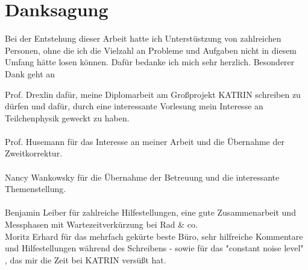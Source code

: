 \chapter*{Danksagung}
Bei der Entstehung dieser Arbeit hatte ich Unterst\"ustzung von zahlreichen Personen, ohne die ich die Vielzahl an Probleme und Aufgaben nicht in diesem Umfang h\"atte l\:osen k\"onnen. Daf\"ur bedanke ich mich sehr herzlich. Besonderer Dank geht an

Prof. Drexlin daf\"ur, meine Diplomarbeit am Gro\ss projekt KATRIN schreiben zu d\"urfen und daf\"ur, durch eine interessante Vorlesung mein Interesse an Teilchenphysik geweckt zu haben.\\\\
Prof. Husemann f\"ur das Interesse an meiner Arbeit und die \"Ubernahme der Zweitkorrektur.\\\\
Nancy Wankowsky f\"ur die \"Ubernahme der Betreuung und die interessante Themenstellung.\\\\
Benjamin Leiber f\"ur zahlreiche Hilfestellungen, eine gute Zusammenarbeit und Messphasen mit Wartezeitverk\"urzung bei Rad \& co.\\
Moritz Erhard f\"ur das mehrfach gek\"urte beste B\"uro, sehr hilfreiche Kommentare und Hilfestellungen w\"ahrend des Schreibens - sowie  f\"ur das "constant noise level" \cite{transformer}, das mir die Zeit bei KATRIN vers\"u\ss t hat.

